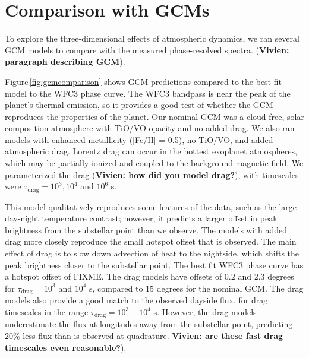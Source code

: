 \documentclass[twocolumn]{aastex61}
\begin{document}


\section{Comparison with GCMs}
\label{sec:gcm}
To explore the three-dimensional effects of atmospheric dynamics, we ran several GCM models to compare with the measured phase-resolved spectra. (\textbf{Vivien: paragraph describing GCM}).


Figure\,\ref{fig:gcmcomparison} shows GCM predictions compared to the best fit model to the WFC3 phase curve. The WFC3 bandpass is near the peak of the planet's thermal emission, so it provides a good test of whether the GCM reproduces the properties of the planet.  Our nominal GCM was a cloud-free, solar composition atmosphere with TiO/VO opacity and no added drag.  We also ran models with enhanced metallicity ([Fe/H] = 0.5), no TiO/VO, and added atmospheric drag.  Lorentz drag can occur in the hottest exoplanet atmospheres, which may be partially ionized and coupled to the background magnetic field. We parameterized the drag (\textbf{Vivien: how did you model drag?}), with timescales were $\tau_\mathrm{drag} = 10^3, 10^4$ and $10^6$ s. 

This model qualitatively reproduces some features of the data, such as the large day-night temperature contrast; however, it predicts a larger offset in peak brightness from the substellar point than we observe. 
The models with added drag more closely reproduce the small hotspot offset that is observed. The main effect of drag is to slow down advection of heat to the nightside, which shifts the peak brightness closer to the substellar point.  The best fit WFC3 phase curve has a hotspot offset of FIXME. The drag models have offsets of $0.2$ and $2.3$ degrees for $\tau_\mathrm{drag} = 10^3$ and $10^4$ s, compared to $15$ degrees for the nominal GCM.  The drag models also provide a good match to the observed dayside flux, for drag timescales in the range $\tau_\mathrm{drag} = 10^3 - 10^4$ s.  However, the drag models underestimate the flux at longitudes away from the substellar point, predicting 20\% less flux than is observed at quadrature. \textbf{Vivien: are these fast drag timescales even reasonable?}).
\end{document}
